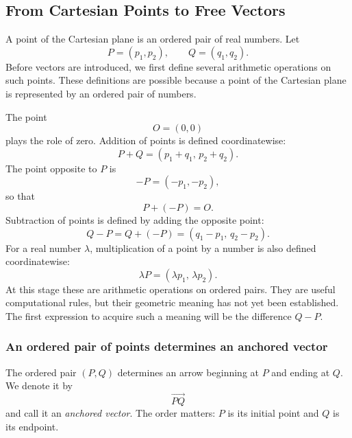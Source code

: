 \subsection{From Cartesian Points to Free Vectors}

A point of the Cartesian plane is an ordered pair of real numbers. Let
\[
P=(p_1,p_2),
\qquad
Q=(q_1,q_2).
\]
Before vectors are introduced, we first define several arithmetic operations on
such points. These definitions are possible because a point of the Cartesian
plane is represented by an ordered pair of numbers.

The point
\[
O=(0,0)
\]
plays the role of zero. Addition of points is defined coordinatewise:
\[
\boxed{
P+Q=(p_1+q_1,\,p_2+q_2)
}.
\]
The point opposite to $P$ is
\[
\boxed{
-P=(-p_1,-p_2)
},
\]
so that
\[
P+(-P)=O.
\]
Subtraction of points is defined by adding the opposite point:
\[
\boxed{
Q-P=Q+(-P)=(q_1-p_1,\,q_2-p_2)
}.
\]
For a real number $\lambda$, multiplication of a point by a number is also
defined coordinatewise:
\[
\boxed{
\lambda P=(\lambda p_1,\,\lambda p_2)
}.
\]
At this stage these are arithmetic operations on ordered pairs. They are useful
computational rules, but their geometric meaning has not yet been established.
The first expression to acquire such a meaning will be the difference $Q-P$.

\subsubsection*{An ordered pair of points determines an anchored vector}

The ordered pair $(P,Q)$ determines an arrow beginning at $P$ and ending at
$Q$. We denote it by
\[
\overrightarrow{PQ}
\]
and call it an \emph{anchored vector}. The order matters: $P$ is its initial
point and $Q$ is its endpoint.

\begin{center}
\end{center}

